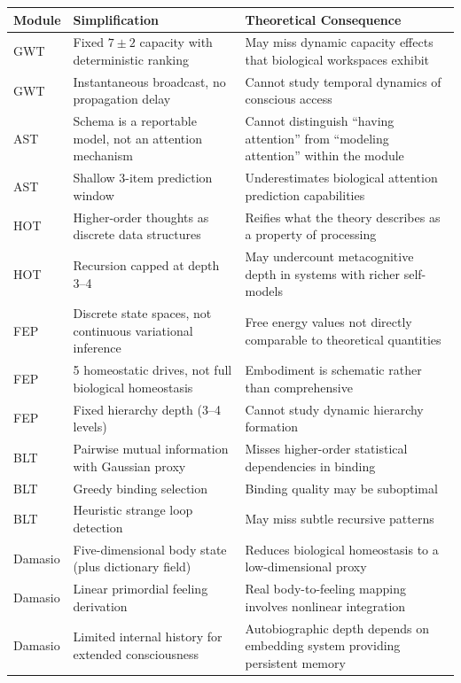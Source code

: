 \begin{table}[t]
\centering
\small
\begin{tabular}{p{1.2cm}p{4.8cm}p{5.5cm}}
\toprule
\textbf{Module} & \textbf{Simplification} & \textbf{Theoretical Consequence} \\
\midrule
GWT & Fixed $7 \pm 2$ capacity with deterministic ranking & May miss dynamic capacity effects that biological workspaces exhibit \\
GWT & Instantaneous broadcast, no propagation delay & Cannot study temporal dynamics of conscious access \\
AST & Schema is a reportable model, not an attention mechanism & Cannot distinguish ``having attention'' from ``modeling attention'' within the module \\
AST & Shallow 3-item prediction window & Underestimates biological attention prediction capabilities \\
HOT & Higher-order thoughts as discrete data structures & Reifies what the theory describes as a property of processing \\
HOT & Recursion capped at depth 3--4 & May undercount metacognitive depth in systems with richer self-models \\
FEP & Discrete state spaces, not continuous variational inference & Free energy values not directly comparable to theoretical quantities \\
FEP & 5 homeostatic drives, not full biological homeostasis & Embodiment is schematic rather than comprehensive \\
FEP & Fixed hierarchy depth (3--4 levels) & Cannot study dynamic hierarchy formation \\
BLT & Pairwise mutual information with Gaussian proxy & Misses higher-order statistical dependencies in binding \\
BLT & Greedy binding selection & Binding quality may be suboptimal \\
BLT & Heuristic strange loop detection & May miss subtle recursive patterns \\
Damasio & Five-dimensional body state (plus dictionary field) & Reduces biological homeostasis to a low-dimensional proxy \\
Damasio & Linear primordial feeling derivation & Real body-to-feeling mapping involves nonlinear integration \\
Damasio & Limited internal history for extended consciousness & Autobiographic depth depends on embedding system providing persistent memory \\

\end{tabular}
\end{table}
